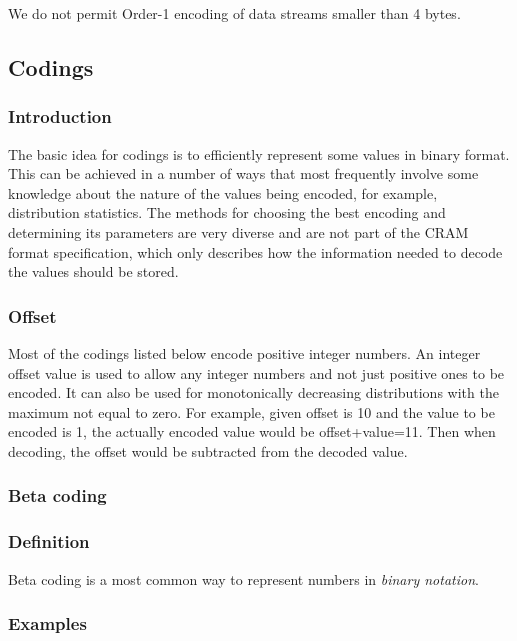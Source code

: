 \documentclass[a4paper]{article}
\begin{document}
We do not permit Order-1 encoding of data streams smaller than 4
bytes.

\subsection{\textbf{Codings}}

\subsubsection*{Introduction}

The basic idea for codings is to efficiently represent some values in binary format. 
This can be achieved in a number of ways that most frequently involve some knowledge 
about the nature of the values being encoded, for example, distribution statistics. 
The methods for choosing the best encoding and determining its parameters are very 
diverse and are not part of the CRAM format specification, which only describes 
how the information needed to decode the values should be stored.

\subsubsection*{Offset}

Most of the codings listed below encode positive integer numbers. An integer offset 
value is used to allow any integer numbers and not just positive ones to be encoded. 
It can also be used for monotonically decreasing distributions with the maximum 
not equal to zero. For example, given offset is 10 and the value to be encoded 
is 1, the actually encoded value would be offset+value=11. Then when decoding, 
the offset would be subtracted from the decoded value. 

\subsubsection*{Beta coding}

\subsubsection*{Definition}

Beta coding is a most common way to represent numbers in \emph{binary notation}. 


\subsubsection*{Examples}
\end{document}
